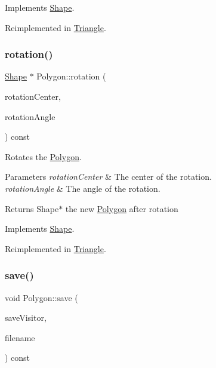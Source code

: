 Implements \hyperlink{class_shape_a0d74dcb2db0791b88b92f439bf4a6972}{Shape}.



Reimplemented in \hyperlink{class_triangle_acd8612cc20ffb71e543944c869e4ab81}{Triangle}.

\hypertarget{class_polygon_a5a453f01700f97ca98b0487cd670b194}{}\label{class_polygon_a5a453f01700f97ca98b0487cd670b194} 
\subsubsection{\texorpdfstring{rotation()}{rotation()}}
{\footnotesize\ttfamily \hyperlink{class_shape}{Shape} $\ast$ Polygon\+::rotation (\begin{DoxyParamCaption}\item[{const \hyperlink{class_vector2_d}{Vector2D} \&}]{rotation\+Center,  }\item[{const \hyperlink{class_radian_angle}{Radian\+Angle} \&}]{rotation\+Angle }\end{DoxyParamCaption}) const\hspace{0.3cm}{\ttfamily [virtual]}}

Rotates the \hyperlink{class_polygon}{Polygon}. 
\begin{DoxyParams}{Parameters}
{\em rotation\+Center} & The center of the rotation. \\
\hline
{\em rotation\+Angle} & The angle of the rotation. \\
\hline
\end{DoxyParams}
\begin{DoxyReturn}{Returns}
Shape$\ast$ the new \hyperlink{class_polygon}{Polygon} after rotation 
\end{DoxyReturn}


Implements \hyperlink{class_shape_abfc7a673b8a6d9a4d646dc15c771aa0d}{Shape}.



Reimplemented in \hyperlink{class_triangle_a663ca3c6bd7967265849bf1f8c8a464b}{Triangle}.

\hypertarget{class_polygon_ad9adb867821b71e1aa8130dccbc9b37f}{}\label{class_polygon_ad9adb867821b71e1aa8130dccbc9b37f} 
\subsubsection{\texorpdfstring{save()}{save()}}
{\footnotesize\ttfamily void Polygon\+::save (\begin{DoxyParamCaption}\item[{const \hyperlink{class_save_visitor}{Save\+Visitor} $\ast$}]{save\+Visitor,  }\item[{const string \&}]{filename }\end{DoxyParamCaption}) const\hspace{0.3cm}{\ttfamily [virtual]}}

